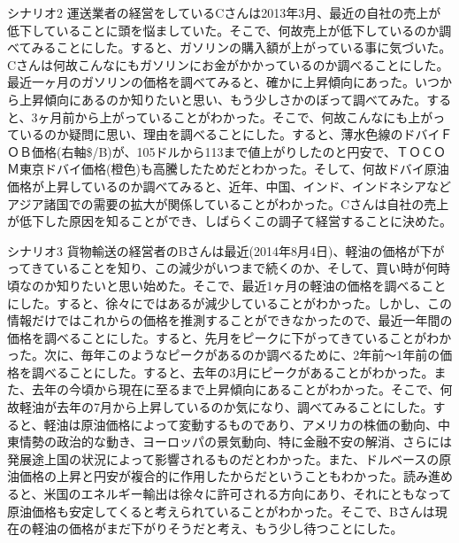 \documentclass{matsushita-zemi}
\begin{document}
\begin{itembox}[l]{シナリオ2}
運送業者の経営をしているCさんは2013年3月、最近の自社の売上が低下していることに頭を悩ましていた。そこで、何故売上が低下しているのか調べてみることにした。すると、ガソリンの購入額が上がっている事に気づいた。Cさんは何故こんなにもガソリンにお金がかかっているのか調べることにした。最近一ヶ月のガソリンの価格を調べてみると、確かに上昇傾向にあった。いつから上昇傾向にあるのか知りたいと思い、もう少しさかのぼって調べてみた。すると、3ヶ月前から上がっていることがわかった。そこで、何故こんなにも上がっているのか疑問に思い、理由を調べることにした。すると、薄水色線のドバイＦＯＢ価格(右軸\$/B)が、105ドルから113まで値上がりしたのと円安で、ＴＯＣＯＭ東京ドバイ価格(橙色)も高騰したためだとわかった。そして、何故ドバイ原油価格が上昇しているのか調べてみると、近年、中国、インド、インドネシアなどアジア諸国での需要の拡大が関係していることがわかった。Cさんは自社の売上が低下した原因を知ることができ、しばらくこの調子て経営することに決めた。
\end{itembox}

\begin{itembox}[l]{シナリオ3}
貨物輸送の経営者のBさんは最近(2014年8月4日)、軽油の価格が下がってきていることを知り、この減少がいつまで続くのか、そして、買い時が何時頃なのか知りたいと思い始めた。そこで、最近1ヶ月の軽油の価格を調べることにした。すると、徐々にではあるが減少していることがわかった。しかし、この情報だけではこれからの価格を推測することができなかったので、最近一年間の価格を調べることにした。すると、先月をピークに下がってきていることがわかった。次に、毎年このようなピークがあるのか調べるために、2年前〜1年前の価格を調べることにした。すると、去年の3月にピークがあることがわかった。また、去年の今頃から現在に至るまで上昇傾向にあることがわかった。そこで、何故軽油が去年の7月から上昇しているのか気になり、調べてみることにした。すると、軽油は原油価格によって変動するものであり、アメリカの株価の動向、中東情勢の政治的な動き、ヨーロッパの景気動向、特に金融不安の解消、さらには発展途上国の状況によって影響されるものだとわかった。また、ドルベースの原油価格の上昇と円安が複合的に作用したからだということもわかった。読み進めると、米国のエネルギー輸出は徐々に許可される方向にあり、それにともなって原油価格も安定してくると考えられていることがわかった。そこで、Bさんは現在の軽油の価格がまだ下がりそうだと考え、もう少し待つことにした。
\end{itembox}
\end{document}
